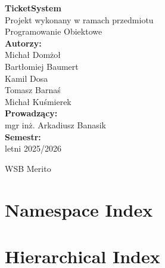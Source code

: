 \documentclass[oneside]{book}
\newcommand{\+}{\discretionary{\mbox{\scriptsize$\hookleftarrow$}}{}{}}
\begin{document}
\raggedbottom

\hypersetup{pageanchor=false}


\begin{titlepage}
\centering

\vspace*{2cm}

{\LARGE \textbf{TicketSystem}}\\[1.2cm]

{\large Projekt wykonany w ramach przedmiotu}\\[0.3cm]
{\Large Programowanie Obiektowe}\\[1.5cm]

\textbf{Autorzy:}\\
Michał Domżoł\\
Bartłomiej Baumert\\
Kamil Dosa\\
Tomasz Barnaś\\
Michał Kuśmierek\\[1cm]

\textbf{Prowadzący:}\\
mgr inż. Arkadiusz Banasik\\[1cm]

\textbf{Semestr:}\\
letni 2025/2026

\vfill
{\small WSB Merito}

\end{titlepage}

\cleardoublepage

\tableofcontents
\cleardoublepage

\hypersetup{pageanchor=true}



\chapter{Namespace Index}


\chapter{Hierarchical Index}

\end{document}
